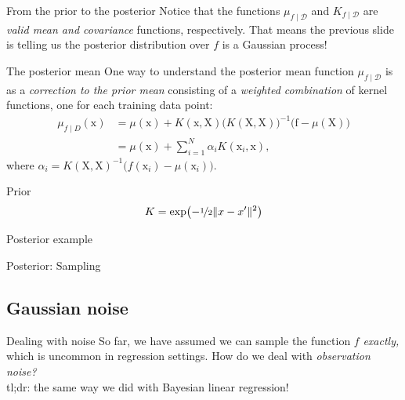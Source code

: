 \documentclass[xcolor={dvipsnames},hyperref={breaklinks=true},12pt]{beamer}
\newcommand{\given}{\mid}
\newcommand{\mc}[1]{\mathcal{#1}}
\newcommand{\data}{\mc{D}}
\newcommand{\inv}{^{-1}}
\newcommand{\mat}[1]{\bm{\mathrm{#1}}}
\renewcommand{\vec}[1]{\bm{\mathrm{#1}}}
\newcommand{\emphr}[1]{{\textcolor{or}{\itshape #1}}}
\begin{document}
\begin{frame}{From the prior to the posterior}
  Notice that the functions $\mu_{f \given \data}$ and $K_{f \given
    \data}$ are \emphr{valid mean and covariance} functions,
  respectively.  That means the previous slide is telling us
  the posterior distribution over $f$ is a Gaussian process!
\end{frame}

\begin{frame}{The posterior mean}
  One way to understand the posterior mean function $\mu_{f \given
    \data}$ is as a \emphr{correction to the prior mean} consisting of
  a \emphr{weighted combination} of kernel functions, one for each
  training data point:
  \begin{align*}
    \mu_{f \given D}(\vec{x})
    &=
    \mu(\vec{x}) +
    K(\vec{x}, \mat{X})
    \bigl(K(\mat{X}, \mat{X})\bigr)^{-1}
    \bigl(\vec{f} - \mu(\mat{X})\bigr)
    \\
    &=
    \mu(\vec{x}) +
    \sum_{i = 1}^N \alpha_i K(\vec{x}_i, \vec{x}),
  \end{align*}
  where $\alpha_i = K(\mat{X}, \mat{X})\inv
  \bigl(f(\vec{x}_i) - \mu(\vec{x}_i) \bigr)$.
\end{frame}

\begin{frame}{Prior}
  \hspace*{-1.5em}
  \begin{equation*}
    K = \exp\bigl(-\nicefrac{1}{2}\lVert x - x' \rVert^2\bigr)
  \end{equation*}
\end{frame}

\begin{frame}{Posterior example}
  \hspace*{-1.5em}
\end{frame}

\begin{frame}{Posterior: Sampling}
  \hspace*{-1.5em}
\end{frame}

\subsection{Gaussian noise}

\begin{frame}{Dealing with noise}
  So far, we have assumed we can sample the function $f$
  \emphr{exactly,} which is uncommon in regression settings.  How do
  we deal with \emphr{observation noise?} \\[1ex]

  tl;dr: the same way we did with Bayesian linear regression!
\end{frame}
\end{document}
